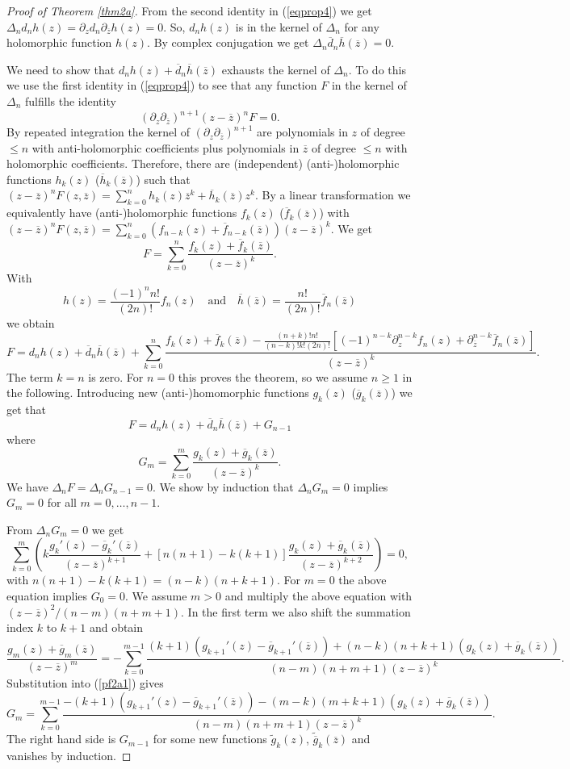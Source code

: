 \documentclass[oneside]{amsart}
\newcommand{\ddd}{{\overline{d}}}
\newcommand{\ff}{{\overline{f}}}
\newcommand{\gggg}{{\overline{g}}}
\newcommand{\hh}{{\overline{h}}}
\newcommand{\zz}{{\overline{z}}}
\theoremstyle{plain}
\begin{document}
\begin{proof}[Proof of Theorem \ref{thm2a}]
From the second identity in (\ref{eqprop4}) we get $\Delta_nd_nh(z)=\partial_zd_n\partial_\zz h(z)=0$. So, $d_nh(z)$ is in the kernel of $\Delta_n$ for any holomorphic function $h(z)$.
By complex conjugation we get $\Delta_n\ddd_n\hh(\zz)=0$.

We need to show that $d_nh(z)+\ddd_n\hh(\zz)$ exhausts the kernel of $\Delta_n$.
To do this we use the first identity in (\ref{eqprop4}) to see that any function $F$ in the kernel of $\Delta_n$ fulfills the identity
$$
(\partial_z\partial_\zz)^{n+1}(z-\zz)^nF=0.
$$
By repeated integration the kernel of $(\partial_z\partial_\zz)^{n+1}$ are polynomials in $z$ of degree $\leq n$ with anti-holomorphic coefficients plus polynomials in $\zz$ of degree $\leq n$
with holomorphic coefficients. Therefore, there are (independent) (anti-)holomorphic functions $h_k(z)$ ($\hh_k(\zz)$) such that $(z-\zz)^nF(z,\zz)=\sum_{k=0}^nh_k(z)\zz^k+\hh_k(\zz)z^k$.
By a linear transformation we equivalently have (anti-)holomorphic functions $f_k(z)$ ($\ff_k(\zz)$) with
$(z-\zz)^nF(z,\zz)=\sum_{k=0}^n(f_{n-k}(z)+\ff_{n-k}(\zz))(z-\zz)^k$. We get
$$
F=\sum_{k=0}^n\frac{f_k(z)+\ff_k(\zz)}{(z-\zz)^k}.
$$
With
$$
h(z)=\frac{(-1)^nn!}{(2n)!}f_n(z)\quad\text{and}\quad\hh(\zz)=\frac{n!}{(2n)!}\ff_n(\zz)
$$
we obtain
$$
F=d_nh(z)+\ddd_n\hh(\zz)+\sum_{k=0}^n\frac{f_k(z)+\ff_k(\zz)-\frac{(n+k)!n!}{(n-k)!k!(2n)!}[(-1)^{n-k}\partial_z^{n-k}f_n(z)+\partial_\zz^{n-k}\ff_n(\zz)]}{(z-\zz)^k}.
$$
The term $k=n$ is zero. For $n=0$ this proves the theorem, so we assume $n\geq1$ in the following.
Introducing new (anti-)homomorphic functions $g_k(z)$ ($\gggg_k(\zz)$) we get that
$$
F=d_nh(z)+\ddd_n\hh(\zz)+G_{n-1}
$$
where
\begin{equation}\label{pf2a1}
G_m=\sum_{k=0}^m\frac{g_k(z)+\gggg_k(\zz)}{(z-\zz)^k}.
\end{equation}
We have $\Delta_nF=\Delta_nG_{n-1}=0$. We show by induction that $\Delta_nG_m=0$ implies $G_m=0$ for all $m=0,\ldots,n-1$.

From $\Delta_nG_m=0$ we get
$$
\sum_{k=0}^m\left(k\frac{g_k'(z)-\gggg_k'(\zz)}{(z-\zz)^{k+1}}+[n(n+1)-k(k+1)]\frac{g_k(z)+\gggg_k(\zz)}{(z-\zz)^{k+2}}\right)=0,
$$
with $n(n+1)-k(k+1)=(n-k)(n+k+1)$. For $m=0$ the above equation implies $G_0=0$. We assume $m>0$ and multiply the above equation with $(z-\zz)^2/(n-m)(n+m+1)$.
In the first term we also shift the summation index $k$ to $k+1$ and obtain
$$
\frac{g_m(z)+\gggg_m(\zz)}{(z-\zz)^m}=-\sum_{k=0}^{m-1}\frac{(k+1)(g_{k+1}'(z)-\gggg_{k+1}'(\zz))+(n-k)(n+k+1)(g_k(z)+\gggg_k(\zz))}{(n-m)(n+m+1)(z-\zz)^k}.
$$
Substitution into (\ref{pf2a1}) gives
$$
G_m=\sum_{k=0}^{m-1}\frac{-(k+1)(g_{k+1}'(z)-\gggg_{k+1}'(\zz))-(m-k)(m+k+1)(g_k(z)+\gggg_k(\zz))}{(n-m)(n+m+1)(z-\zz)^k}.
$$
The right hand side is $G_{m-1}$ for some new functions $\widetilde{g}_k(z)$, $\widetilde{\gggg}_k(\zz)$ and vanishes by induction.
\end{proof}
\end{document}
